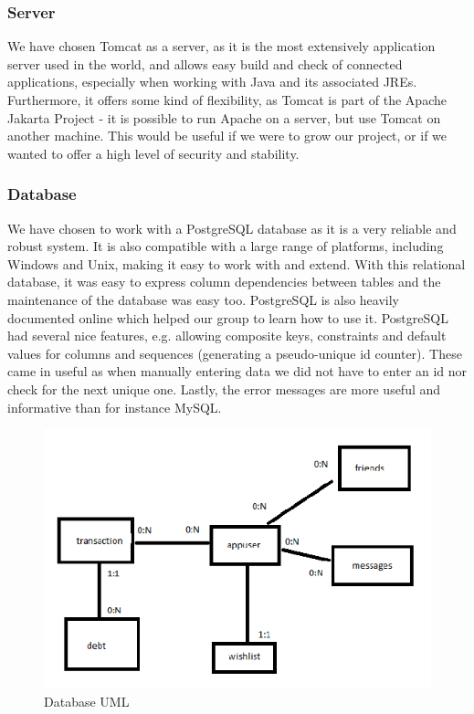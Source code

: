 \documentclass[a4paper,11pt]{article}
\begin{document}
\subsubsection*{Server}
We have chosen Tomcat as a server, as it is the most extensively application server used in the world, and allows easy build and check of connected applications, especially when working with Java and its associated JREs.
Furthermore, it offers some kind of flexibility, as Tomcat is part of the Apache Jakarta Project - it is possible to run Apache on a server, but use Tomcat on another machine. This would be useful if we were to grow our project, or if we wanted to offer a high level of security and stability.

\subsubsection*{Database}
We have chosen to work with a PostgreSQL database as it is a very reliable and robust system. It is also compatible with a large range of platforms, including Windows and Unix, making it easy to work with and extend.
With this relational database, it was easy to express column dependencies between tables and the maintenance of the database was easy too. PostgreSQL is also heavily documented online which helped our group to learn how to use it. PostgreSQL had several nice features, e.g. allowing composite keys, constraints and default values for columns and sequences (generating a pseudo-unique id counter). These came in useful as when manually entering data we did not have to enter an id nor check for the next unique one. Lastly, the error messages are more useful and informative than for instance MySQL.

\begin{figure}[ht]
\begin{center}
\advance\leftskip-3cm
\advance\rightskip-3cm
\includegraphics[keepaspectratio=true,scale=0.5]{uml}
\caption{Database UML}
\label{visina8}
\end{center}
\end{figure}
\end{document}
